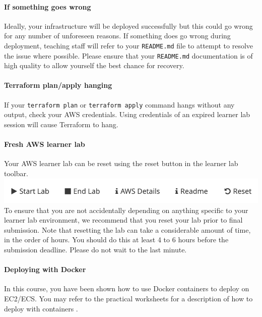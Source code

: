 \documentclass{csse4400}
\begin{document}
\paragraph{If something goes wrong}
Ideally, your infrastructure will be deployed successfully but this could go wrong for any number of unforeseen reasons.
If something does go wrong during deployment,
teaching staff will refer to your \texttt{README.md} file to attempt to resolve the issue where possible.
Please ensure that your \texttt{README.md} documentation is of high quality to allow yourself the best chance for recovery.

\paragraph{Terraform plan/apply hanging}
If your \texttt{terraform plan} or \texttt{terraform apply} command hangs without any output,
check your AWS credentials.
Using credentials of an expired learner lab session will cause Terraform to hang.

\paragraph{Fresh AWS learner lab}
Your AWS learner lab can be reset using the reset button in the learner lab toolbar.
\includegraphics[width=\textwidth]{images/reset-button.png}
To ensure that you are not accidentally depending on anything specific to your learner lab environment,
we recommend that you reset your lab prior to final submission.
Note that resetting the lab can take a considerable amount of time, in the order of hours.
You should do this at least 4 to 6 hours before the submission deadline.
Please do not wait to the last minute.

\paragraph{Deploying with Docker}
In this course,
you have been shown how to use Docker containers to deploy on EC2/ECS.
You may refer to the practical worksheets for a description of how to deploy with containers \cite{prac-week5}.

\end{document}

